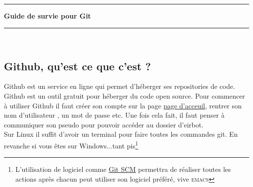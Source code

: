 \documentclass[a4paper,10pt]{article}
\newcommand{\HRule}{\rule{\linewidth}{0.1mm}}
\begin{document}
\begin{spacing}{1.5}
\graphicspath{{image/}}
\setcounter{tocdepth}{2}
\newpage
\pagestyle{fancy} \lhead{} 
\rhead{\thepage} \lfoot{} \cfoot{} 
\HRule
\begin{center}
  \LARGE \textbf{Guide de survie pour Git}
\end{center}
\HRule \\

\subsection*{Github, qu'est ce que c'est ?}
Github est un service en ligne qui permet d'héberger ses repositories de code.
Github est un outil gratuit pour héberger du code open source.
Pour commencer à utiliser Github il faut créer son compte sur la page
\href{https://github.com/join?source=header-home}{page d'acceuil}, rentrer son
nom d'utilisateur , un mot de passe etc. Une fois cela fait, il faut
penser à communiquer son pseudo pour pouvoir accéder au dossier d'eirbot. \\
Sur Linux il suffit d'avoir un terminal pour faire toutes les commandes git. En
revanche si vous êtes sur Windows...tant pis\footnote{L'utilisation de logiciel
  comme \href{https://gitforwindows.org/}{Git SCM} permettra de réaliser toutes
  les actions après chacun peut utiliser son logiciel préféré, vive \textsc{emacs}}


\end{spacing}
\end{document}

